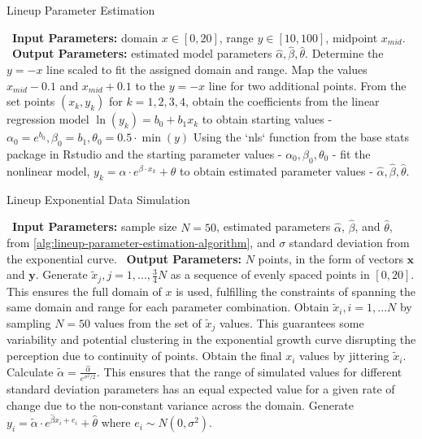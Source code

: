 \documentclass[print]{nuthesis}
\begin{document}
\begin{algorithm}
  \caption{Lineup Parameter Estimation}\label{alg:lineup-parameter-estimation-algorithm}
  \begin{algorithmic}[1]
    \Statex \textbullet~\textbf{Input Parameters:} domain $x\in[0,20]$, range $y\in[10,100]$, midpoint $x_{mid}$.
    \Statex \textbullet~\textbf{Output Parameters:} estimated model parameters $\hat\alpha, \hat\beta, \hat\theta$.
    \State Determine the $y=-x$ line scaled to fit the assigned domain and range.
    \State Map the values $x_{mid} - 0.1$ and $x_{mid} + 0.1$ to the $y=-x$ line for two additional points.
    \State From the set points $(x_k, y_k)$ for $k = 1,2,3,4$, obtain the coefficients from the linear regression model $\ln(y_k) = b_0 +b_1x_k$ to obtain starting values - $\alpha_0 = e^{b_0}, \beta_0 =  b_1, \theta_0 = 0.5\cdot \min(y)$
    \State Using the `nls` function from the base stats package in Rstudio and the starting parameter values - $\alpha_0, \beta_0, \theta_0$ - fit the nonlinear model, $y_k = \alpha\cdot e^{\beta\cdot x_k}+\theta$ to obtain estimated parameter values - $\hat\alpha, \hat\beta, \hat\theta.$
  \end{algorithmic}
\end{algorithm}

\begin{algorithm}
  \caption{Lineup Exponential Data Simulation}\label{alg:lineup-exponential-data-simulation-algorithm}
  \begin{algorithmic}[1]
    \Statex \textbullet~\textbf{Input Parameters:} sample size $N = 50$, estimated parameters $\hat\alpha$, $\hat\beta$, and $\hat\theta$, from \cref{alg:lineup-parameter-estimation-algorithm}, and $\sigma$ standard deviation from the exponential curve.
    \Statex \textbullet~\textbf{Output Parameters:} $N$ points, in the form of vectors $\mathbf{x}$ and $\mathbf{y}$.
    \State Generate $\tilde x_j, j = 1,..., \frac{3}{4}N$ as a sequence of evenly spaced points in $[0,20]$. This ensures the full domain of $x$ is used, fulfilling the constraints of spanning the same domain and range for each parameter combination.
    \State Obtain $\tilde x_i, i = 1,...N$ by sampling $N = 50$ values from the set of $\tilde x_j$ values. This guarantees some variability and potential clustering in the exponential growth curve disrupting the perception due to continuity of points.
    \State Obtain the final $x_i$ values by jittering $\tilde x_i$.
    \State Calculate $\tilde\alpha = \frac{\hat\alpha}{e^{\sigma^2/2}}.$ This ensures that the range of simulated values for different standard deviation parameters has an equal expected value for a given rate of change due to the non-constant variance across the domain.
    \State Generate $y_i = \tilde\alpha\cdot e^{\hat\beta x_i + e_i}+\hat\theta$ where $e_i\sim N(0,\sigma^2).$
  \end{algorithmic}
\end{algorithm}
\end{document}
